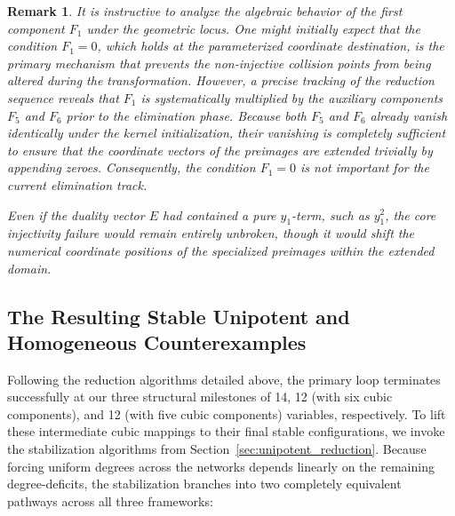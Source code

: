\documentclass[11pt,a4paper]{article}
\newtheorem{remark}[theorem]{Remark}
\begin{document}
\begin{remark}
It is instructive to analyze the algebraic behavior of the first component $F_1$ under the geometric locus. One might initially expect that the condition $F_1 = 0$, which holds at the parameterized coordinate destination, is the primary mechanism that prevents the non-injective collision points from being altered during the transformation. However, a precise tracking of the reduction sequence reveals that $F_1$ is systematically multiplied by the auxiliary components $F_5$ and $F_6$ prior to the elimination phase. Because both $F_5$ and $F_6$ already vanish identically under the kernel initialization, their vanishing is completely sufficient to ensure that the coordinate vectors of the preimages are extended trivially by appending zeroes. Consequently, the condition $F_1 = 0$ is not important for the current elimination track. 

Even if the duality vector $E$ had contained a pure $y_1$-term, such as $y_1^2$, the core injectivity failure would remain entirely unbroken, though it would shift the numerical coordinate positions of the specialized preimages within the extended domain.
\end{remark}

\subsection{The Resulting Stable Unipotent and Homogeneous Counterexamples}
\label{subsec:cubic_stable_mappings}

Following the reduction algorithms detailed above, the primary loop terminates successfully at our three structural milestones of 14, 12 (with six cubic components), and 12 (with five cubic components) variables, respectively. To lift these intermediate cubic mappings to their final stable configurations, we invoke the stabilization algorithms from Section~\ref{sec:unipotent_reduction}. Because forcing uniform degrees across the networks depends linearly on the remaining degree-deficits, the stabilization branches into two completely equivalent pathways across all three frameworks:
\end{document}
